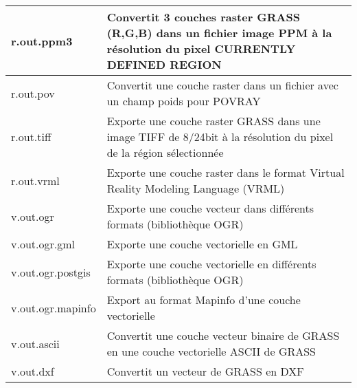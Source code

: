\begin{table}[ht]
\begin{tabular}{|p{4cm}|p{12cm}|}
  \hline r.out.ppm3 & Convertit 3 couches raster GRASS (R,G,B) dans un fichier image PPM \`a la r\'esolution du pixel CURRENTLY DEFINED REGION \\
  \hline r.out.pov & Convertit une couche raster dans un fichier avec un champ poids pour POVRAY\\
  \hline r.out.tiff & Exporte une couche raster GRASS dans une image TIFF de 8/24bit \`a la r\'esolution du pixel de la r\'egion s\'electionn\'ee\\
  \hline r.out.vrml & Exporte une couche raster dans le format Virtual Reality Modeling Language (VRML)\\
  \hline v.out.ogr & Exporte une couche vecteur dans diff\'erents formats (biblioth\`eque OGR) \\
  \hline v.out.ogr.gml & Exporte une couche vectorielle en GML \\
  \hline v.out.ogr.postgis & Exporte une couche vectorielle en diff\'erents formats (biblioth\`eque OGR) \\
  \hline v.out.ogr.mapinfo & Export au format Mapinfo d'une couche vectorielle\\
  \hline v.out.ascii & Convertit une couche vecteur binaire de GRASS en une couche vectorielle ASCII de GRASS\\
  \hline v.out.dxf & Convertit un vecteur de GRASS en DXF \\
\hline
\end{tabular}
\end{table}

